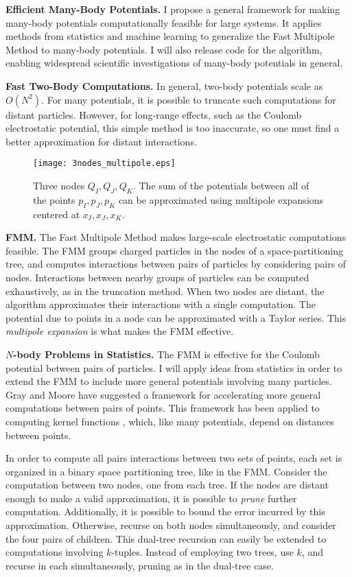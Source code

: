 \documentclass[twoside,leqno, 12pt]{article}
\begin{document}
\textbf{Efficient Many-Body Potentials.}  I propose a general framework for making many-body potentials computationally feasible for large systems.  It applies methods from statistics and machine learning to generalize the Fast Multipole Method to many-body potentials.  I will also release code for the algorithm, enabling widespread scientific investigations of many-body potentials in general.


\textbf{Fast Two-Body Computations.}  In general, two-body potentials scale as $O(N^2)$.  For many potentials, it is possible to truncate such computations for distant particles.  However, for long-range effects, such as the Coulomb electrostatic potential, this simple method is too inaccurate, so one must find a better approximation for distant interactions.  

\begin{figure}[th]
\centering
\texttt{[image: 3nodes\_multipole.eps]}
\caption{Three nodes $Q_I, Q_J, Q_K$.  The sum of the potentials between all of the points $p_I, p_J, p_K$ can be approximated using multipole expansions centered at $x_I, x_J, x_K$.}
\label{three_nodes}
\end{figure}

\textbf{FMM.}  The Fast Multipole Method \cite{grngard} makes large-scale electrostatic computations feasible.  The FMM groups charged particles in the nodes of a space-partitioning tree, and computes interactions between pairs of particles by considering pairs of nodes.  Interactions between nearby groups of particles can be computed exhaustively, as in the truncation method.  When two nodes are distant, the algorithm approximates their interactions with a single computation.  The potential due to points in a node can be approximated with a Taylor series.  This \emph{multipole expansion} is what makes the FMM effective.


\textbf{$N$-body Problems in Statistics.}  The FMM is effective for the Coulomb potential between pairs of particles.  I will apply ideas from statistics in order to extend the FMM to include more general potentials involving many particles.  Gray and Moore \cite{gray_nbody} have suggested a framework for accelerating more general computations between pairs of points.  This framework has been applied to computing kernel functions \cite{NIPS2005_570}, which, like many potentials, depend on distances between points.

In order to compute all pairs interactions between two sets of points, each set is organized in a binary space partitioning tree, like in the FMM.  Consider the computation between two nodes, one from each tree.  If the nodes are distant enough to make a valid approximation, it is possible to \emph{prune} further computation.  Additionally, it is possible to bound the error incurred by this approximation.  Otherwise, recurse on both nodes simultaneously, and consider the four pairs of children.  This dual-tree recursion can easily be extended to computations involving $k$-tuples.  Instead of employing two trees,  use $k$, and recurse in each simultaneously, pruning as in the dual-tree case. 
\end{document}
